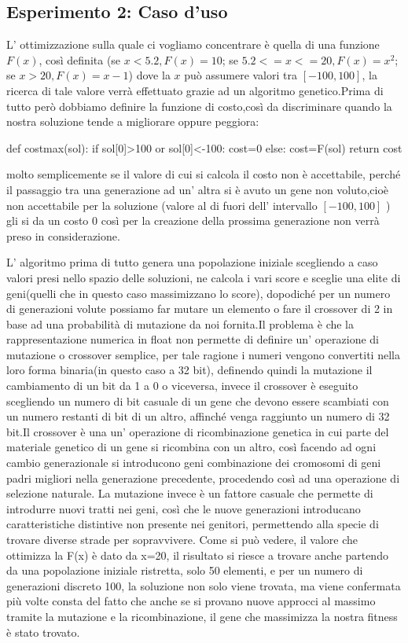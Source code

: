 		\subsection{Esperimento 2: Caso d'uso}
			L' ottimizzazione sulla quale ci vogliamo concentrare è quella di una funzione $F(x)$, così definita (se $x<5.2,F(x)=10$; se $5.2<=x<=20,F(x)=x^2$; se $x>20,F(x)=x-1$) dove la $x$ può assumere valori tra $[-100,100]$, la ricerca di tale valore verrà effettuato grazie ad un algoritmo genetico.Prima di tutto però dobbiamo definire la funzione di costo,così da discriminare quando la nostra soluzione tende a migliorare oppure peggiora:
			\begin{python}
		def costmax(sol):
			if sol[0]>100 or sol[0]<-100:
				cost=0
			else:
				cost=F(sol)
		return cost  
			\end{python}
			molto semplicemente se il valore di cui si calcola il costo non è accettabile, perché il passaggio tra una generazione ad un' altra si è avuto un gene non voluto,cioè non accettabile per la soluzione (valore al di fuori dell' intervallo $[-100,100]$ ) gli si da un costo 0 così per la creazione della prossima generazione non verrà preso in considerazione.\par
			L' algoritmo prima di tutto genera una popolazione iniziale scegliendo a caso valori presi nello spazio delle soluzioni, ne calcola i vari score e sceglie una elite di geni(quelli che in questo caso massimizzano lo score), dopodiché per un numero di generazioni volute possiamo far mutare un elemento o fare il crossover di 2 in base ad una probabilità di mutazione da noi fornita.Il problema è che la rappresentazione numerica in float non permette di definire un' operazione di mutazione o crossover semplice, per tale ragione i numeri vengono convertiti nella loro forma binaria(in questo caso a 32 bit), definendo quindi la mutazione il cambiamento di un bit da 1 a 0 o viceversa, invece il crossover è eseguito scegliendo un numero di bit casuale di un gene che devono essere scambiati con un numero restanti di bit di un altro, affinché venga raggiunto un numero di 32 bit.Il crossover è una un' operazione di ricombinazione genetica in cui parte del materiale genetico di un gene si ricombina con un altro, così facendo ad ogni cambio generazionale si introducono geni combinazione dei cromosomi di geni padri migliori nella generazione precedente, procedendo così ad una operazione di selezione naturale.
			La mutazione invece è un fattore casuale che permette di introdurre nuovi tratti nei geni, così che le nuove generazioni introducano caratteristiche distintive non presente nei genitori, permettendo alla specie di trovare diverse strade per sopravvivere.
			Come si può vedere, il valore che ottimizza la F(x) è dato da x=20, il risultato si riesce a trovare anche partendo da una popolazione iniziale ristretta, solo 50 elementi, e per un numero di generazioni discreto 100, la soluzione non solo viene trovata, ma viene confermata più volte consta del fatto che anche se si provano nuove approcci al massimo tramite la mutazione e la ricombinazione, il gene che massimizza la nostra fitness è stato trovato.
